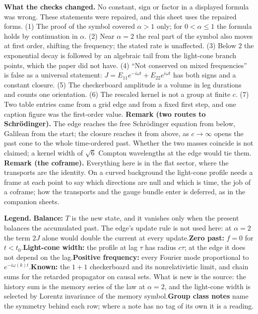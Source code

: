 \documentclass[10pt]{article}
\begin{document}
\vspace{1pt}
\begin{smallbox}
\textbf{What the checks changed.} No constant, sign or factor in a displayed formula was wrong. These statements were repaired, and this sheet uses the repaired forms. (1) The proof of the symbol covered $\alpha>1$ only; for $0<\alpha\le1$ the formula holds by continuation in $\alpha$. (2) Near $\alpha=2$ the real part of the symbol also moves at first order, shifting the frequency; the stated rate is unaffected. (3) Below $2$ the exponential decay is followed by an algebraic tail from the light-cone branch points, which the paper did not have. (4) ``Not conserved on mixed frequencies'' is false as a universal statement: $J=E_{11}e^{-i\omega t}+E_{22}e^{i\omega t}$ has both signs and a constant closure. (5) The checkerboard amplitude is a volume in leg durations and counts one orientation. (6) The rescaled kernel is not a group at finite $c$. (7) Two table entries came from a grid edge and from a fixed first step, and one caption figure was the first-order value. \textbf{Remark (two routes to Schr\"odinger).} The edge reaches the free Schr\"odinger equation from below, Galilean from the start; the closure reaches it from above, as $c\to\infty$ opens the past cone to the whole time-ordered past. Whether the two masses coincide is not claimed; a kernel width of $\sqrt6$ Compton wavelengths at the edge would tie them. \textbf{Remark (the coframe).} Everything here is in the flat sector, where the transports are the identity. On a curved background the light-cone profile needs a frame at each point to say which directions are null and which is time, the job of a coframe; how the transports and the gauge bundle enter is deferred, as in the companion sheets.
\end{smallbox}

\vspace{1pt}
\begin{smallbox}
\textbf{Legend.} \textbf{Balance:} $T$ is the new state, and it vanishes only when the present balances the accumulated past. The edge's update rule is not used here: at $\alpha=2$ the term $2J$ alone would double the current at every update.\quad \textbf{Zero past:} $f=0$ for $t<t_0$.\quad \textbf{Light-cone width:} the profile at lag $\tau$ has radius $c\tau$; at the edge it does not depend on the lag.\quad \textbf{Positive frequency:} every Fourier mode proportional to $e^{-i\omega(k)t}$.\quad \textbf{Known:} the $1+1$ checkerboard and its nonrelativistic limit, and chain sums for the retarded propagator on causal sets. What is new is the source: the history sum is the memory series of the law at $\alpha=2$, and the light-cone width is selected by Lorentz invariance of the memory symbol.\quad \textbf{Group class notes} name the symmetry behind each row; where a note has no tag of its own it is a reading.
\end{smallbox}
\end{document}
